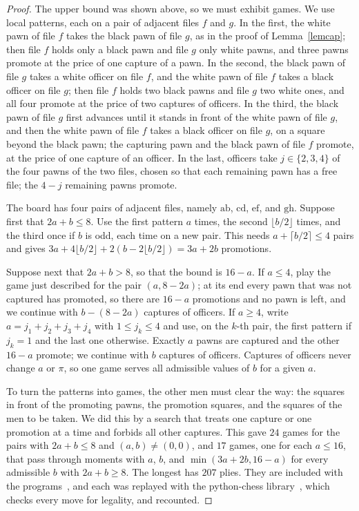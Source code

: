 \documentclass[12pt,reqno]{article}
\newcommand{\sq}[1]{\mathrm{#1}}
\begin{document}
\begin{proof}
The upper bound was shown above, so we must exhibit games. We use local patterns, each on a
pair of adjacent files $f$ and $g$. In the first, the white pawn of file $f$ takes the black pawn of
file $g$, as in the proof of Lemma~\ref{lemcap}; then file $f$ holds only a black pawn and file $g$
only white pawns, and three pawns promote at the price of one capture of a pawn. In the
second, the black pawn of file $g$ takes a white officer on file $f$, and the white pawn of file $f$
takes a black officer on file $g$; then file $f$ holds two black pawns and file $g$ two white ones,
and all four promote at the price of two captures of officers. In the third, the black pawn of
file $g$ first advances until it stands in front of the white pawn of file $g$, and then the white
pawn of file $f$ takes a black officer on file $g$, on a square beyond the black pawn; the capturing
pawn and the black pawn of file $f$ promote, at the price of one capture of an officer. In the
last, officers take $j\in\{2,3,4\}$ of the four pawns of the two files, chosen so that each remaining
pawn has a free file; the $4-j$ remaining pawns promote.

The board has four pairs of adjacent files, namely $\sq{a}\sq{b}$, $\sq{c}\sq{d}$, $\sq{e}\sq{f}$,
and $\sq{g}\sq{h}$. Suppose first that $2a+b\leq 8$. Use the first pattern $a$ times, the second
$\lfloor b/2\rfloor$ times, and the third once if $b$ is odd, each time on a new pair. This needs
$a+\lceil b/2\rceil\leq 4$ pairs and gives $3a+4\lfloor b/2\rfloor+2(b-2\lfloor b/2\rfloor)=3a+2b$
promotions.

Suppose next that $2a+b>8$, so that the bound is $16-a$. If $a\leq 4$, play the game just
described for the pair $(a,8-2a)$; at its end every pawn that was not captured has promoted, so
there are $16-a$ promotions and no pawn is left, and we continue with $b-(8-2a)$ captures of
officers. If $a\geq 4$, write $a=j_1+j_2+j_3+j_4$ with $1\leq j_k\leq 4$ and use, on the $k$-th pair,
the first pattern if $j_k=1$ and the last one otherwise. Exactly $a$ pawns are captured and the
other $16-a$ promote; we continue with $b$ captures of officers. Captures of officers never
change $a$ or $\pi$, so one game serves all admissible values of $b$ for a given $a$.

To turn the patterns into games, the other men must clear the way: the squares in front of the
promoting pawns, the promotion squares, and the squares of the men to be taken. We did this by
a search that treats one capture or one promotion at a time and forbids all other captures. This
gave $24$ games for the pairs with $2a+b\leq 8$ and $(a,b)\neq(0,0)$, and $17$ games, one for
each $a\leq 16$, that pass through moments with $a$, $b$, and $\min(3a+2b,16-a)$ for every
admissible $b$ with $2a+b\geq 8$. The longest has $207$ plies. They are included with the
programs~\cite{software}, and each was replayed with the python-chess library~\cite{pychess},
which checks every move for legality, and recounted.
\end{proof}
\end{document}

